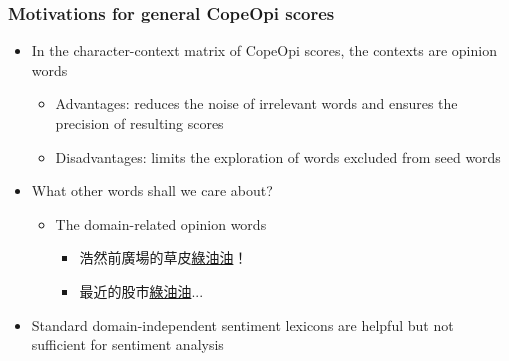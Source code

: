 \documentclass[mathserif]{beamer}
\begin{document}
\begin{frame}
\frametitle{Motivations for general CopeOpi scores}
\begin{itemize}
\item In the character-context matrix of CopeOpi scores, the contexts are opinion words
	\begin{itemize}
	\item Advantages: reduces the noise of irrelevant words and ensures the precision of resulting scores
	\item Disadvantages: limits the exploration of words excluded from seed words
	\end{itemize}
\item What other words shall we care about?
	\begin{itemize}
	\item The domain-related opinion words
		\begin{itemize}
		\item 浩然前廣場的草皮\underline{綠油油}！
		\item 最近的股市\underline{綠油油}...
		\end{itemize}
	\end{itemize}
\item Standard domain-independent sentiment lexicons are helpful but not sufficient for sentiment analysis
\end{itemize}
\begin{flushright}
\end{flushright}
\end{frame}
\end{document}
